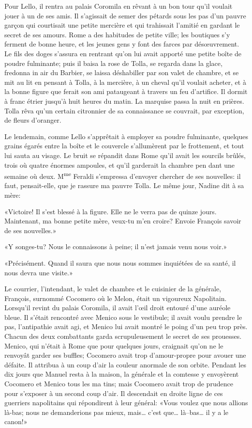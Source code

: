 Pour Lello, il rentra au palais Coromila en rêvant à un bon tour qu'il
voulait jouer à un de ses amis. Il s'agissait de semer des pétards sous
les pas d'un pauvre garçon qui courtisait une petite mercière et qui
trahissait l'amitié en gardant le secret de ses amours. Rome a des
habitudes de petite ville; les boutiques s'y ferment de bonne heure, et
les jeunes gens y font des farces par désœuvrement. Le fils des doges
s'assura en rentrant qu'on lui avait apporté une petite boîte de poudre
fulminante; puis il baisa la rose de Tolla, se regarda dans la glace,
fredonna in air du Barbier, se laissa déshabiller par son valet de
chambre, et se mit au lit en pensant à Tolla, à la mercière, à un cheval
qu'il voulait acheter, et à la bonne figure que ferait son ami
pataugeant à travers un feu d'artifice. Il dormit à franc étrier jusqu'à
huit heures du matin. La marquise passa la nuit en prières. Tolla rêva
qu'un certain citronnier de sa connaissance se couvrait, par exception,
de fleurs d'oranger.

Le lendemain, comme Lello s'apprêtait à employer sa poudre fulminante,
quelques grains égarés entre la boîte et le couvercle s'allumèrent par
le frottement, et tout lui sauta au visage. Le bruit se répandit dans
Rome qu'il avait les sourcils brûlés, trois où quatre énormes ampoules,
et qu'il garderait la chambre pen dant une semaine où deux.
M\textsuperscript{me} Feraldi s'empressa d'envoyer chercher de ses
nouvelles: il faut, pensait-elle, que je rassure ma pauvre Tolla. Le
même jour, Nadine dit à sa mère:

«Victoire! Il s'est blessé à la figure. Elle ne le verra pas de quinze
jours. Maintenant, ma bonne petite mère, veux-tu m'en croire? Envoie
François savoir de ses nouvelles.»

«Y songes-tu? Nous le connaissons à peine; il n'est jamais venu nous
voir.»

«Précisément. Quand il saura que nous nous sommes inquiétées de sa
santé, il nous devra une visite.»

Le courrier, l'intendant, le valet de chambre et le cuisinier de la
générale, François, surnommé Cocomero où le Melon, était un vigoureux
Napolitain. Lorsqu'il revint du palais Coromila, il avait l'œil droit
entouré d'une auréole bleue. Il s'était rencontré avec Menico sous le
vestibule; il avait voulu prendre le pas, l'antipathie avait agi, et
Menico lui avait montré le poing d'un peu trop près. Chacun des deux
combattants garda scrupuleusement le secret de ses prouesses. Menico,
qui n'était à Rome que pour quelques jours, craignait qu'on ne le
renvoyât garder ses buffles; Cocomero avait trop d'amour-propre pour
avouer une défaite. Il attribua à un coup d'air la couleur anormale de
son orbite. Pendant les dix jours que Manuel resta à la maison, la
générale et la comtesse y envoyèrent Cocomero et Menico tous les ma
tins; mais Cocomero avait trop de prudence pour s'exposer à un second
coup d'air. Il descendait en droite ligne de ces guerriers napolitains
qui répondirent à leur général: «Vous voulez que nous allions là-bas;
nous ne demanderions pas mieux, mais\ldots{} c'est que\ldots{}
là--bas\ldots{} il y a le canon!»


